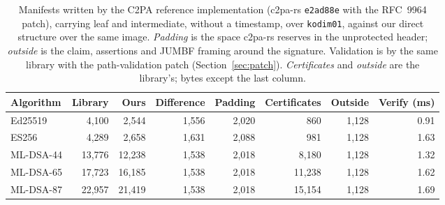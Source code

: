 \begin{table}[t]
\caption{Manifests written by the C2PA reference implementation (c2pa-rs \texttt{e2ad88e} with the RFC~9964 patch), carrying leaf and intermediate, without a timestamp, over \texttt{kodim01}, against our direct structure over the same image. \emph{Padding} is the space c2pa-rs reserves in the unprotected header; \emph{outside} is the claim, assertions and JUMBF framing around the signature. Validation is by the same library with the path-validation patch (Section~\ref{sec:patch}). \emph{Certificates} and \emph{outside} are the library's; bytes except the last column.}
\label{tab:c2parust}
\small
\setlength{\tabcolsep}{4pt}
\begin{tabular}{lrrrrrrr}
\toprule
Algorithm & Library & Ours & Difference & Padding & Certificates & Outside & Verify (ms)\\
\midrule
Ed25519 & 4,100 & 2,544 & 1,556 & 2,020 & 860 & 1,128 & 0.91\\
ES256 & 4,289 & 2,658 & 1,631 & 2,088 & 981 & 1,128 & 1.63\\
ML-DSA-44 & 13,776 & 12,238 & 1,538 & 2,018 & 8,180 & 1,128 & 1.32\\
ML-DSA-65 & 17,723 & 16,185 & 1,538 & 2,018 & 11,238 & 1,128 & 1.62\\
ML-DSA-87 & 22,957 & 21,419 & 1,538 & 2,018 & 15,154 & 1,128 & 1.69\\
\bottomrule
\end{tabular}
\end{table}
